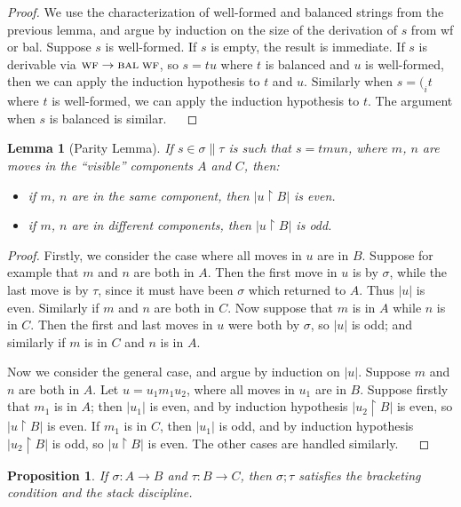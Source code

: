 \documentclass[11pt]{article}
\newtheorem{lemma}[theorem]{Lemma}
\newtheorem{proposition}[theorem]{Proposition}
\newcommand{\Fr}{\rightarrow}
\newcommand{\Rest}{{\upharpoonright}}
\begin{document}
\begin{proof} We use the characterization of well-formed and
balanced strings from the previous lemma, and argue by induction
on the size of the derivation of $s$ from {\sc wf} or {\sc bal}.
Suppose $s$ is well-formed. If $s$ is empty, the result is
immediate. If $s$ is derivable via $\mbox{\sc wf} \rightarrow
\mbox{\sc bal} \; \mbox{\sc wf}$, so $s = tu$ where $t$ is
balanced and $u$ is well-formed, then we can apply the induction
hypothesis to $t$ and $u$. Similarly when $s = (_{i} t$ where $t$
is well-formed, we can apply the induction hypothesis to $t$. The
argument when $s$ is balanced is similar. $\;\;\; $
\end{proof}

\begin{lemma}[Parity Lemma]
If $s \in \sigma \| \tau $ is such that $s = tmun$, where
$m$, $n$ are moves in the ``visible'' components $A$ and $C$, then:
\begin{itemize}
\item if $m$, $n$ are in the {\em same} component, then $|u \Rest B|$ is even.
\item if $m$, $n$ are in {\em different} components, then $|u \Rest B|$ is odd.
\end{itemize}
\end{lemma}

\begin{proof} Firstly, we consider the case where all moves in $u$
are in $B$. Suppose for example that $m$ and $n$ are both in $A$.
Then the first move in $u$ is by $\sigma$, while the last move is
by $\tau$, since it must have been $\sigma$ which returned to $A$.
Thus $|u|$ is even. Similarly if $m$ and $n$ are both in $C$. Now
suppose that $m$ is in $A$ while $n$ is in $C$. Then the first and
last moves in $u$ were both by $\sigma$, so $|u|$ is odd; and
similarly if $m$ is in $C$ and $n$ is in $A$.

Now we consider the general case, and argue by induction on $|u|$.
Suppose $m$ and $n$ are both in $A$. Let $u = u_{1}m_{1}u_{2}$,
where all moves in $u_{1}$ are in $B$. Suppose firstly that $m_1$
is in $A$; then $|u_{1}|$ is even, and by induction hypothesis
$|u_{2} \Rest B|$ is even, so $|u \Rest B|$ is even. If $m_1$ is
in $C$, then $|u_{1}|$ is odd, and by induction hypothesis $|u_{2}
\Rest B|$ is odd, so $|u \Rest B|$ is even. The other cases are
handled similarly. $\;\;\; $
\end{proof}

\begin{proposition}
If $\sigma : A \Fr B$ and $\tau : B \Fr C$, then $\sigma ; \tau$ satisfies
the bracketing condition and the stack discipline.
\end{proposition}
\end{document}
